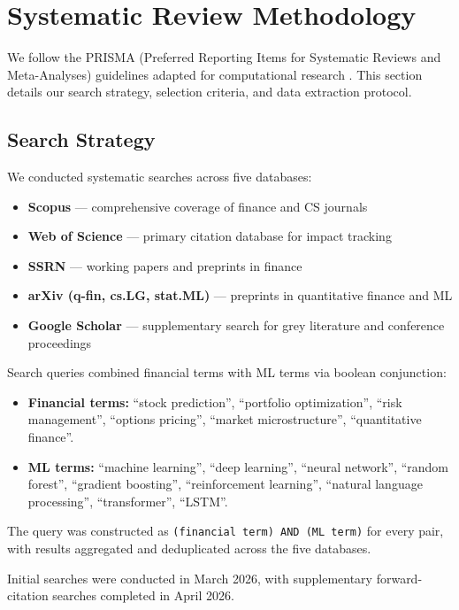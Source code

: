 \section{Systematic Review Methodology}\label{sec:methodology}

We follow the PRISMA (Preferred Reporting Items for Systematic Reviews and Meta-Analyses) guidelines adapted for computational research \citep{Page2021}. This section details our search strategy, selection criteria, and data extraction protocol.

\subsection{Search Strategy}

We conducted systematic searches across five databases:
\begin{itemize}[leftmargin=*]
    \item \textbf{Scopus} --- comprehensive coverage of finance and CS journals
    \item \textbf{Web of Science} --- primary citation database for impact tracking
    \item \textbf{SSRN} --- working papers and preprints in finance
    \item \textbf{arXiv (q-fin, cs.LG, stat.ML)} --- preprints in quantitative finance and ML
    \item \textbf{Google Scholar} --- supplementary search for grey literature and conference proceedings
\end{itemize}

Search queries combined financial terms with ML terms via boolean conjunction:

\begin{itemize}[leftmargin=*]
    \item \textbf{Financial terms:} ``stock prediction'', ``portfolio optimization'', ``risk management'', ``options pricing'', ``market microstructure'', ``quantitative finance''.
    \item \textbf{ML terms:} ``machine learning'', ``deep learning'', ``neural network'', ``random forest'', ``gradient boosting'', ``reinforcement learning'', ``natural language processing'', ``transformer'', ``LSTM''.
\end{itemize}

The query was constructed as \texttt{(financial term) AND (ML term)} for every pair, with results aggregated and deduplicated across the five databases.

Initial searches were conducted in March 2026, with supplementary forward-citation searches completed in April 2026.


